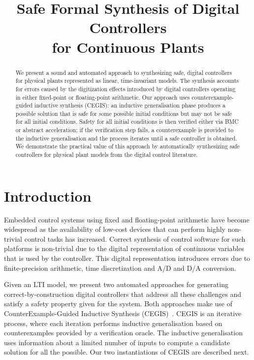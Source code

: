 \documentclass[submission]{eptcs}
\title{Safe Formal Synthesis of Digital Controllers\\
for Continuous Plants}
\begin{document}
\maketitle

\begin{abstract}
We present a sound and automated approach to synthesizing safe,
digital controllers for physical plants represented as linear,
time-invariant models. The synthesis
accounts for errors caused by the digitization effects introduced by
digital controllers operating in either fixed-point or floating-point arithmetic. 
Our approach uses counterexample-guided inductive
synthesis (CEGIS): an inductive generalisation phase produces a
possible solution that is safe for some possible initial conditions but may
not be safe for all initial conditions. Safety for all initial conditions
is then verified either
via BMC or abstract acceleration; if the verification step fails, a
counterexample is provided to the inductive generalisation and the
process iterates until a safe controller is obtained.  We demonstrate
the practical value of this approach by automatically synthesizing
safe controllers for physical plant models from the digital control
literature.
\end{abstract}

\section{Introduction}

Embedded control systems using fixed and floating-point arithmetic 
have become widespread
as the availability of low-cost devices that can perform highly
non-trivial control tasks has increased. Correct synthesis of
control software for such platforms is non-trivial due to the digital representation of continuous variables
that is used by the controller. This digital representation introduces 
errors due to finite-precision arithmetic, time discretization and 
A/D and D/A conversion.


%
Given an LTI model, we present two automated approaches for generating
correct-by-construction digital controllers that address all these
challenges and satisfy a safety property given for the system. Both approaches make use of CounterExample-Guided
Inductive Synthesis (CEGIS)~\cite{jha-icse10,
  DBLP:conf/asplos/Solar-LezamaTBSS06}.  CEGIS is an
iterative process, where each iteration performs inductive
generalisation based on counterexamples provided by a verification
oracle. The inductive generalisation uses information
about a limited number of inputs to compute a candidate solution
for all the possible. Our two instantiations of CEGIS are
described next.
\end{document}
